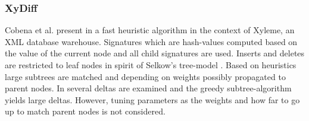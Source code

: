 \subsubsection{XyDiff\cite{cobena2002detecting}}
Cobena et al. present in \cite{cobena2002detecting} a fast heuristic algorithm in the context of Xyleme, an XML database warehouse. %
Signatures which are hash-values computed based on the value of the current node and all child signatures are used. Inserts and deletes are restricted to leaf nodes in spirit of Selkow's tree-model \cite{tai1979tree}. Based on heuristics large subtrees are matched and depending on weights possibly propagated to parent nodes. In \cite{ronnau2009efficient} several deltas are examined and the greedy subtree-algorithm yields large deltas. However, tuning parameters as the weights and how far to go up to match parent nodes is not considered.


